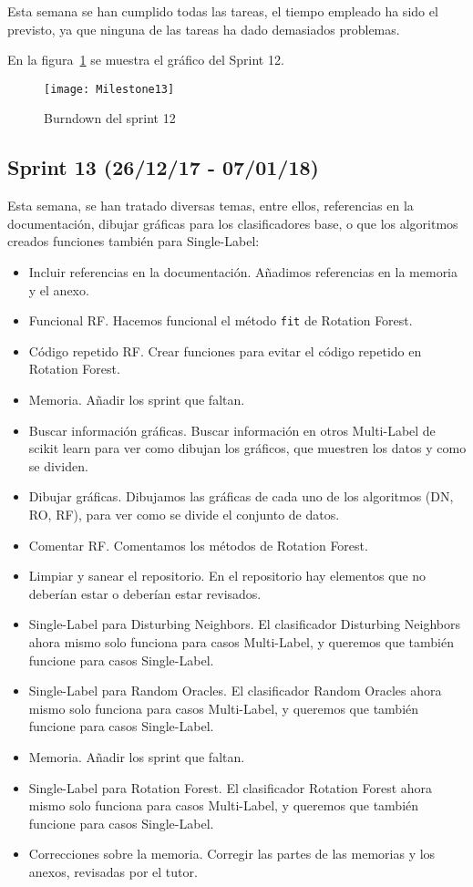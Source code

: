Esta semana se han cumplido todas las tareas, el tiempo empleado ha sido el previsto, ya que ninguna de las tareas ha dado demasiados problemas.

En la figura~\ref{fig:Milestone13} se muestra el gráfico del Sprint 12.

\begin{figure}
\centering
\texttt{[image: Milestone13]}
\caption{Burndown del sprint 12}
\label{fig:Milestone13}
\end{figure}

\subsection{Sprint 13 (26/12/17 - 07/01/18)}
Esta semana, se han tratado diversas temas, entre ellos, referencias en la documentación, dibujar gráficas para los clasificadores base, o que los algoritmos creados funciones también para Single-Label:
\begin{itemize}
\item Incluir referencias en la documentación. Añadimos referencias en la memoria y el anexo.
\item Funcional RF. Hacemos funcional el método \texttt{fit} de Rotation Forest.
\item Código repetido RF. Crear funciones para evitar el código repetido en Rotation Forest.
\item Memoria. Añadir los sprint que faltan.
\item Buscar información gráficas. Buscar información en otros Multi-Label de scikit learn para ver como dibujan los gráficos, que muestren los datos y como se dividen.
\item Dibujar gráficas. Dibujamos las gráficas de cada uno de los algoritmos (DN, RO, RF), para ver como se divide el conjunto de datos.
\item Comentar RF. Comentamos los métodos de Rotation Forest.
\item Limpiar y sanear el repositorio. En el repositorio hay elementos que no deberían estar o deberían estar revisados.
\item Single-Label para Disturbing Neighbors. El clasificador Disturbing Neighbors ahora mismo solo funciona para casos Multi-Label, y queremos que también funcione para casos Single-Label.
\item Single-Label para Random Oracles. El clasificador Random Oracles ahora mismo solo funciona para casos Multi-Label, y queremos que también funcione para casos Single-Label.
\item Memoria. Añadir los sprint que faltan.
\item Single-Label para Rotation Forest. El clasificador Rotation Forest ahora mismo solo funciona para casos Multi-Label, y queremos que también funcione para casos Single-Label.
\item Correcciones sobre la memoria. Corregir las partes de las memorias y los anexos, revisadas por el tutor.
\end{itemize}

